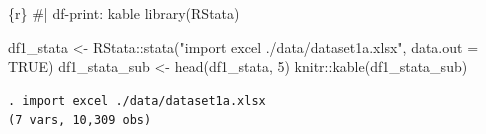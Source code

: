 \documentclass[
  letterpaper,
  DIV=11,
  numbers=noendperiod,
  oneside]{scrreprt}
\newenvironment{Shaded}{\begin{snugshade}}{\end{snugshade}}
\newcommand{\AttributeTok}[1]{\textcolor[rgb]{0.40,0.45,0.13}{#1}}
\newcommand{\CommentTok}[1]{\textcolor[rgb]{0.37,0.37,0.37}{#1}}
\newcommand{\ConstantTok}[1]{\textcolor[rgb]{0.56,0.35,0.01}{#1}}
\newcommand{\DecValTok}[1]{\textcolor[rgb]{0.68,0.00,0.00}{#1}}
\newcommand{\FunctionTok}[1]{\textcolor[rgb]{0.28,0.35,0.67}{#1}}
\newcommand{\InformationTok}[1]{\textcolor[rgb]{0.37,0.37,0.37}{#1}}
\newcommand{\NormalTok}[1]{\textcolor[rgb]{0.00,0.23,0.31}{#1}}
\newcommand{\OtherTok}[1]{\textcolor[rgb]{0.00,0.23,0.31}{#1}}
\newcommand{\SpecialCharTok}[1]{\textcolor[rgb]{0.37,0.37,0.37}{#1}}
\newcommand{\StringTok}[1]{\textcolor[rgb]{0.13,0.47,0.30}{#1}}
\begin{document}
\begin{Shaded}
\begin{Highlighting}[]
\InformationTok{\textasciigrave{}\textasciigrave{}\textasciigrave{}\{r\}}
\CommentTok{\#| df{-}print: kable}
\FunctionTok{library}\NormalTok{(RStata)}

\NormalTok{df1\_stata }\OtherTok{\textless{}{-}}\NormalTok{ RStata}\SpecialCharTok{::}\FunctionTok{stata}\NormalTok{(}\StringTok{"import excel ./data/dataset1a.xlsx"}\NormalTok{,}
                     \AttributeTok{data.out =} \ConstantTok{TRUE}\NormalTok{)}
\NormalTok{df1\_stata\_sub }\OtherTok{\textless{}{-}} \FunctionTok{head}\NormalTok{(df1\_stata, }\DecValTok{5}\NormalTok{)}
\NormalTok{knitr}\SpecialCharTok{::}\FunctionTok{kable}\NormalTok{(df1\_stata\_sub)}
\InformationTok{\textasciigrave{}\textasciigrave{}\textasciigrave{}}
\end{Highlighting}
\end{Shaded}

\begin{verbatim}
. import excel ./data/dataset1a.xlsx
(7 vars, 10,309 obs)
\end{verbatim}
\end{document}
